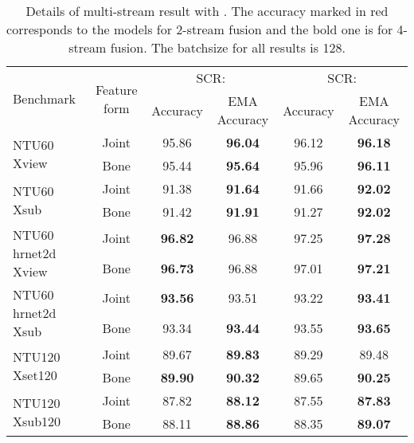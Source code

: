 \documentclass[10pt,twocolumn,letterpaper]{article}
\begin{document}
\begin{table*}[htbp]
  \centering
  \caption{Details of multi-stream result with . The accuracy marked in red corresponds to the models for 2-stream fusion and the bold one is for 4-stream fusion. The batchsize for all results is 128.}
    \begin{tabular}{l|c|cc|cc}
    \toprule
    \multirow{2}[0]{*}{Benchmark} & \multirow{2}[0]{*}{Feature form} & \multicolumn{2}{c}{SCR:}& \multicolumn{2}{c}{SCR:}\\
              &               &    Accuracy & EMA Accuracy& Accuracy & EMA Accuracy\\
    \midrule
    \multirow{2}[2]{*}{NTU60 Xview} &  Joint  & 95.86  & \textbf{96.04} &  96.12 &  \textbf{\color{red}96.18}\\
                                    &  Bone   & 95.44  &\textbf{ 95.64} &  95.96  &   \textbf{\color{red}96.11}\\
    \midrule
    \multirow{2}[2]{*}{NTU60 Xsub} & Joint  & 91.38  & \textbf{91.64} & 91.66  & \textbf{\color{red}92.02}\\
                                   & Bone   & 91.42  & \textbf{91.91} & 91.27  & \textbf{\color{red}92.02}\\
    \midrule
    \multirow{2}[2]{*}{NTU60 hrnet2d Xview } &  Joint  & \textbf{96.82}  & 96.88 & 97.25  &   \textbf{\color{red}97.28}\\
                                             &   Bone   & \textbf{96.73}  & 96.88 & 97.01  &  \textbf{\color{red}97.21}\\
    \midrule
    \multirow{2}[2]{*}{NTU60 hrnet2d Xsub} & Joint   &  \textbf{\color{red}93.56}  &{93.51} &  93.22 &  \textbf{93.41}\\
                                           & Bone & 93.34  &  \textbf{93.44} &  93.55 & \textbf{\color{red}93.65}\\
    \midrule
    \multirow{2}[1]{*}{NTU120 Xset120} & Joint   & 89.67  & \textbf{\color{red}89.83}  &  89.29 & 89.48 \\
                                       & Bone   & \textbf{89.90} & \textbf{\color{red}90.32}  &  89.65 &  \textbf{90.25}\\
    \midrule
    \multirow{2}[2]{*}{NTU120 Xsub120} & Joint   & 87.82  & \textbf{\color{red}88.12} &  87.55 & \textbf{87.83}\\
                                       & Bone    & 88.11  &  \textbf{88.86} &  88.35 & \textbf{\color{red}89.07}\\
    \bottomrule

\end{tabular}
\end{table*}
\end{document}
